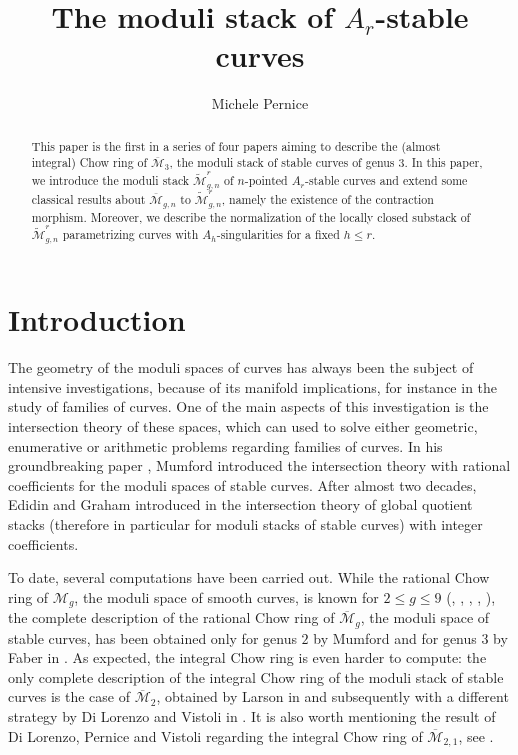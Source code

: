 \documentclass{alggeom}
\numberwithin{equation}{section}
\numberwithin{subsection}{section}
\theoremstyle{definition}
\theoremstyle{remark}
\newcommand\cM{\mathcal{M}} \newcommand\cN{\mathcal{N}}
\newcommand{\Mbar}{\overline{\cM}}
\newcommand{\Mtilde}{\widetilde{\mathcal M}}
\begin{document}
\title{The moduli stack of $A_r$-stable curves}
\author{Michele Pernice}
\address{KTH, Room 1642, Lindstedtsv\"agen 25,
114 28, Stockholm }




\begin{abstract}
	
	This paper is the first in a series of four papers aiming to describe the (almost integral) Chow ring of $\Mbar_3$, the moduli stack of stable curves of genus $3$. In this paper, we introduce the moduli stack $\Mtilde_{g,n}^r$ of $n$-pointed $A_r$-stable curves and extend some classical results about $\Mbar_{g,n}$ to $\Mtilde_{g,n}^r$, namely the existence of the contraction morphism. Moreover, we describe the normalization of the locally closed substack of $\Mtilde_{g,n}^r$ parametrizing curves with $A_h$-singularities for a fixed $h\leq r$. 
\end{abstract}

\maketitle
\section*{Introduction}

The geometry of the moduli spaces of curves has always been the subject of intensive investigations, because of its manifold implications, for instance in the study of families of curves. One of the main aspects of this investigation is the intersection theory of these spaces, which can used to solve either geometric, enumerative or arithmetic problems regarding families of curves. In his groundbreaking paper \cite{Mum}, Mumford introduced the intersection theory with rational coefficients for the moduli spaces of stable curves. After almost two decades, Edidin and Graham introduced in \cite{EdGra} the intersection theory of global quotient stacks (therefore in particular for moduli stacks of stable curves) with integer coefficients.

To date, several computations have been carried out. While the rational Chow ring of $\cM_g$, the moduli space of smooth curves, is known for $2\leq g\leq 9$ (\cite{Mum}, \cite{Fab}, \cite{Iza}, \cite{PenVak}, \cite{CanLar}), the complete description of the rational Chow ring of $\Mbar_g$, the moduli space of stable curves, has been obtained only for genus $2$ by Mumford and for genus $3$ by Faber in \cite{Fab}. As expected, the integral Chow ring is even harder to compute: the only complete description of the integral Chow ring of the moduli stack of stable curves is the case of $\Mbar_2$, obtained by Larson in \cite{Lar} and subsequently with a different strategy by Di Lorenzo and Vistoli in \cite{DiLorVis}. It is also worth mentioning the result of Di Lorenzo, Pernice and Vistoli regarding the integral Chow ring of $\Mbar_{2,1}$, see \cite{DiLorPerVis}.
\end{document}

